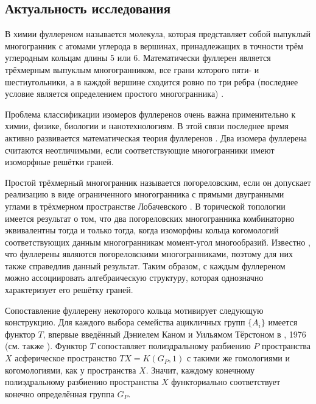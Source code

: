 \documentclass[14pt, dvipsnames, twoside]{extarticle}
\theoremstyle{definition}
\theoremstyle{remark}
\begin{document}
\subsection{Актуальность исследования}


В химии фуллереном называется молекула, которая представляет собой выпуклый многогранник с атомами углерода в вершинах, принадлежащих в точности трём углеродным кольцам длины 5 или 6. Математически фуллерен является трёхмерным выпуклым многогранником, все грани которого пяти- и шестиугольники, а в каждой вершине сходится ровно по три ребра (последнее условие является определением простого многогранника) \cite{Fullerenes}. 

Проблема классификации изомеров фуллеренов очень важна применительно к химии, физике, биологии и нанотехнологиям. В этой связи последнее время активно развивается математическая теория фуллеренов \cite{Bille, StructuralChemistry}. Два изомера фуллерена считаются неотличимыми, если соответствующие многогранники имеют изоморфные решётки граней.

Простой трёхмерный многогранник называется погореловским, если он допускает реализацию в виде ограниченного многогранника с прямыми двугранными углами в трёхмерном пространстве Лобачевского \cite{ErokhovetsFullerenes}. В торической топологии имеется результат \cite{Fullerenes} о том, что два погореловских многогранника комбинаторно эквивалентны тогда и только тогда, когда изоморфны кольца когомологий соответствующих данным многогранникам момент-угол многообразий. Известно \cite{Fullerenes}, что фуллерены являются погореловскими многогранниками, поэтому для них также справедлив данный результат. Таким образом, с каждым фуллереном можно ассоциировать алгебраическую структуру, которая однозначно характеризует его решётку граней. 

Сопоставление фуллерену некоторого кольца мотивирует следующую конструкцию. Для каждого выбора семейства ацикличных групп $\{A_i\}$ имеется функтор $T$, впервые введённый Дэниелем Каном и Уильямом Тёрстоном в \cite{Kan}, 1976 (см. также \cite{BDH, Maunder}). Функтор $T$ сопоставляет полиэдральному разбиению $P$ пространства $X$ асферическое пространство $TX = K(G_P, 1)$ с такими же гомологиями и когомологиями, как у пространства $X$. Значит, каждому конечному полиэдральному разбиению пространства $X$ функториально соответствует конечно определённая группа $G_P$.
\end{document}
